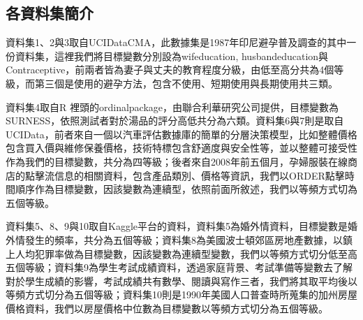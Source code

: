 \begin{table}[H]
	\footnotesize
    \centering
    \extrarowheight=3pt
    \caption{各資料集樣態 - B形式}\label{tab.4.1.1.2b}
\end{table}


\subsection{各資料集簡介}
	
	資料集1、2與3取自UCI\;Data\;CMA，此數據集是1987年印尼避孕普及調查的其中一份資料集，這裡我們將目標變數分別設為wife\;ducation, husband\;education與Contraceptive，前兩者皆為妻子與丈夫的教育程度分級，由低至高分共為4個等級，而第三個是使用的避孕方法，包含不使用、短期使用與長期使用共三類。
	
	資料集4取自R 裡頭的ordinal\;package，由聯合利華研究公司提供，目標變數為SURNESS，依照測試者對於湯品的評分高低共分為六類。資料集6與7則是取自UCI\;Data，前者來自一個以汽車評估數據庫的簡單的分層決策模型，比如整體價格包含買入價與維修保養價格，技術特標包含舒適度與安全性等，並以整體可接受性作為我們的目標變數，共分為四等級；後者來自2008年前五個月，孕婦服裝在線商店的點擊流信息的相關資料，包含產品類別、價格等資訊，我們以ORDER點擊時間順序作為目標變數，因該變數為連續型，依照前面所敘述，我們以等頻方式切為五個等級。

	資料集5、8、9與10取自Kaggle平台的資料，資料集5為婚外情資料，目標變數是婚外情發生的頻率，共分為五個等級；資料集8為美國波士頓郊區房地產數據，以鎮上人均犯罪率做為目標變數，因該變數為連續型變數，我們以等頻方式切分低至高五個等級；資料集9為學生考試成績資料，透過家庭背景、考試準備等變數去了解對於學生成績的影響，考試成績共有數學、閱讀與寫作三者，我們將其取平均後以等頻方式切分為五個等級；資料集10則是1990年美國人口普查時所蒐集的加州房屋價格資料，我們以房屋價格中位數為目標變數以等頻方式切分為五個等級。
	

